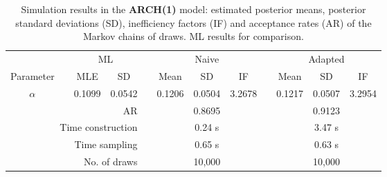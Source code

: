 { \renewcommand{\arraystretch}{1.3} 
\begin{table}[h] 
\centering 
\caption{Simulation results in the \textbf{ARCH(1)} model: estimated posterior means, posterior standard deviations (SD), inefficiency factors (IF) and acceptance rates (AR) of the Markov chains of draws. ML results for comparison.} 
\label{tab:posterior_arch} 
\begin{tabular}{cc rr c rrr c rrr}  
 & & \multicolumn{2}{c}{ML} & & \multicolumn{3}{c}{Naive} & & \multicolumn{3}{c}{Adapted} \\  \cline{3-4} \cline{6-8} \cline{10-12} 
 Parameter & &  \multicolumn{1}{c}{MLE} &  \multicolumn{1}{c}{SD}  & &  \multicolumn{1}{c}{Mean} &  \multicolumn{1}{c}{SD} &  \multicolumn{1}{c}{IF} & &  \multicolumn{1}{c}{Mean} &  \multicolumn{1}{c}{SD} &  \multicolumn{1}{c}{IF} \\ \cline{1-1}  \cline{3-4} \cline{6-8} \cline{10-12}  
$\alpha$ & & 0.1099 &  0.0542 & & 0.1206 &  0.0504 &  3.2678 & & 0.1217 &  0.0507 &  3.2954 \\ [1ex] 
\cline{1-1}  \cline{3-4} \cline{6-8} \cline{10-12}   
\multicolumn{4}{r}{AR} & &\multicolumn{3}{c}{0.8695} &&\multicolumn{3}{c}{0.9123} \\ 
  \cline{1-4} \cline{6-8} \cline{10-12}  
 \multicolumn{4}{r}{Time construction} & &\multicolumn{3}{c}{0.24 s} &&\multicolumn{3}{c}{3.47 s} \\ 
   \multicolumn{4}{r}{Time sampling} & &\multicolumn{3}{c}{0.65 s} &&\multicolumn{3}{c}{0.63 s} \\ 
   \multicolumn{4}{r}{No. of draws }& &\multicolumn{3}{c}{10,000} &&\multicolumn{3}{c}{10,000} \\ 
  \cline{1-4} \cline{6-8} \cline{10-12} 
\hline 
\end{tabular} 
\end{table} 
} 
